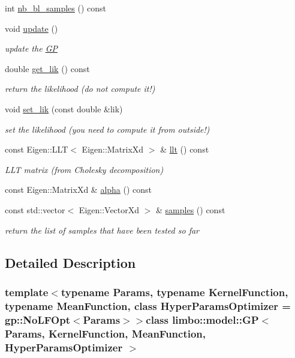 \begin{DoxyCompactItemize}
int \hyperlink{classlimbo_1_1model_1_1_g_p_aa41665d2029a541ce5fe85647fe3662d}{nb\+\_\+bl\+\_\+samples} () const 
\item 
void \hyperlink{classlimbo_1_1model_1_1_g_p_af9563c3faaa672e814772a1a2a877e24}{update} ()
\begin{DoxyCompactList}\small\item\em update the \hyperlink{classlimbo_1_1model_1_1_g_p}{G\+P} \end{DoxyCompactList}\item 
double \hyperlink{classlimbo_1_1model_1_1_g_p_a794ed0eeda29aaa7afe303b5e72d3927}{get\+\_\+lik} () const 
\begin{DoxyCompactList}\small\item\em return the likelihood (do not compute it!) \end{DoxyCompactList}\item 
void \hyperlink{classlimbo_1_1model_1_1_g_p_a4dfc1807eb4f113191dbd3ae51c053ee}{set\+\_\+lik} (const double \&lik)
\begin{DoxyCompactList}\small\item\em set the likelihood (you need to compute it from outside!) \end{DoxyCompactList}\item 
const Eigen\+::\+L\+L\+T$<$ Eigen\+::\+Matrix\+Xd $>$ \& \hyperlink{classlimbo_1_1model_1_1_g_p_ac6d67788494fe1de9a7dddc4e55e857c}{llt} () const 
\begin{DoxyCompactList}\small\item\em L\+L\+T matrix (from Cholesky decomposition) \end{DoxyCompactList}\item 
const Eigen\+::\+Matrix\+Xd \& \hyperlink{classlimbo_1_1model_1_1_g_p_adab606218ab9ef0c35babf8d1cc16d81}{alpha} () const 
\item 
const std\+::vector$<$ Eigen\+::\+Vector\+Xd $>$ \& \hyperlink{classlimbo_1_1model_1_1_g_p_abaa15a2e503bac670dd1a35fb377aa23}{samples} () const 
\begin{DoxyCompactList}\small\item\em return the list of samples that have been tested so far \end{DoxyCompactList}\end{DoxyCompactItemize}


\subsection{Detailed Description}
\subsubsection*{template$<$typename Params, typename Kernel\+Function, typename Mean\+Function, class Hyper\+Params\+Optimizer = gp\+::\+No\+L\+F\+Opt$<$\+Params$>$$>$class limbo\+::model\+::\+G\+P$<$ Params, Kernel\+Function, Mean\+Function, Hyper\+Params\+Optimizer $>$}

